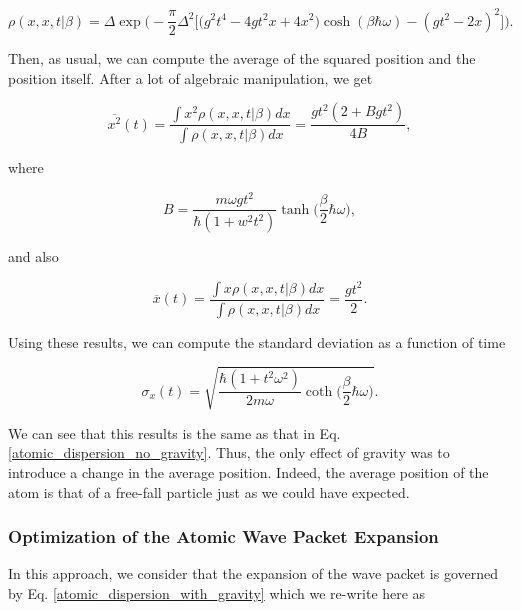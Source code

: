 \documentclass{article}
\begin{document}
\begin{equation}
    \rho(x,x,t|\beta) = \Delta \exp \bigg( -\frac{\pi}{2} \Delta^{2} \Big[ \big( g^{2} t^{4} - 4g t^{2}x + 4x^{2} \big)\cosh(\beta \hbar \omega) - (g t^{2} - 2x)^{2} \Big] \bigg).
\end{equation}

Then, as usual, we can compute the average of the squared position and the position itself. After a lot of algebraic manipulation, we get

\begin{equation}
    \overline{x^{2}} (t)= \frac{\int x^{2} \rho(x,x,t|\beta) dx}{\int \rho(x,x,t|\beta) dx} =  \frac{g t^{2} (2+B g t^{2})}{4B},
\end{equation}

where 

\begin{equation}
    B = \frac{m \omega g t^{2}}{\hbar (1+w^{2}t^{2})} \tanh \bigg(\frac{\beta}{2} \hbar \omega\bigg),
\end{equation}

and also

\begin{equation}\label{average_position_dipole_trap}
    \overline{x} (t)= \frac{\int x \rho(x,x,t|\beta) dx}{\int \rho(x,x,t|\beta) dx} =  \frac{g t^{2}}{2}.
\end{equation}

Using these results, we can compute the standard deviation as a function of time

\begin{equation}\label{atomic_dispersion_with_gravity}
    \sigma_{x} (t) = \sqrt{\frac{\hbar (1+t^{2} \omega^{2})}{2 m \omega} \coth \bigg(\frac{\beta}{2} \hbar \omega \bigg)}.
\end{equation}

We can see that this results is the same as that in Eq. \ref{atomic_dispersion_no_gravity}. Thus, the only effect of gravity was to introduce a change in the average position. Indeed, the average position of the atom is that of a free-fall particle just as we could have expected.

\subsubsection{Optimization of the Atomic Wave Packet Expansion}
In this approach, we consider that the expansion of the wave packet is governed by Eq. \ref{atomic_dispersion_with_gravity} which we re-write here as
\end{document}
